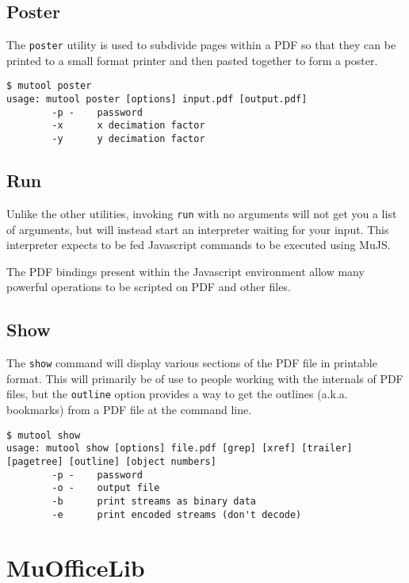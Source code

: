 \documentclass[oneside]{book}
\begin{document}
\section{Poster}

The \texttt{poster} utility is used to subdivide pages within a PDF so that they can be printed to a small format printer and then pasted together to form a poster.

\begin{lstlisting}
$ mutool poster
usage: mutool poster [options] input.pdf [output.pdf]
        -p -    password
        -x      x decimation factor
        -y      y decimation factor
\end{lstlisting}

\section{Run}

Unlike the other utilities, invoking \texttt{run} with no arguments will not get you a list of arguments, but will instead start an interpreter waiting for your input. This interpreter expects to be fed Javascript commands to be executed using MuJS.

The PDF bindings present within the Javascript environment allow many powerful operations to be scripted on PDF and other files.

\section{Show}

The \texttt{show} command will display various sections of the PDF file in printable format. This will primarily be of use to people working with the internals of PDF files, but the \texttt{outline} option provides a way to get the outlines (a.k.a. bookmarks) from a PDF file at the command line.

\begin{lstlisting}
$ mutool show
usage: mutool show [options] file.pdf [grep] [xref] [trailer] [pagetree] [outline] [object numbers]
        -p -    password
        -o -    output file
        -b      print streams as binary data
        -e      print encoded streams (don't decode)
\end{lstlisting}

\chapter{MuOfficeLib}
\end{document}
